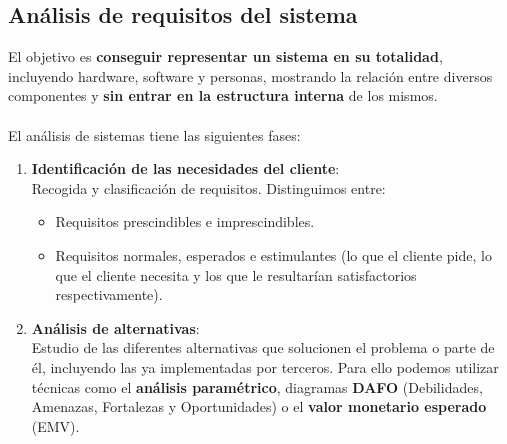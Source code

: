 \subsection{Análisis de requisitos del sistema}

El objetivo es \textbf{conseguir representar un sistema en su totalidad}, incluyendo hardware, software y personas, mostrando la relación entre diversos componentes y \textbf{sin entrar en la estructura interna} de los mismos.\\\\
El análisis de sistemas tiene las siguientes fases:
\begin{enumerate}
    \item \textbf{Identificación de las necesidades del cliente}:\\
          Recogida y clasificación de requisitos. Distinguimos entre:
          \begin{itemize}
              \item Requisitos prescindibles e imprescindibles.
              \item Requisitos normales, esperados e estimulantes (lo que el cliente pide, lo que el cliente necesita y los que le resultarían satisfactorios respectivamente). %
          \end{itemize} %
    \item \textbf{Análisis de alternativas}:\\ Estudio de las diferentes alternativas que solucionen el problema o parte de él, incluyendo las ya implementadas por terceros. Para ello podemos utilizar técnicas como el \textbf{análisis paramétrico}, diagramas \textbf{DAFO} (Debilidades, Amenazas, Fortalezas y Oportunidades) o el \textbf{valor monetario esperado} (EMV).
          \begin{table}[h]
              \centering
\end{table}
\end{enumerate}
